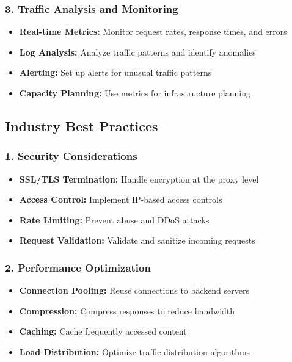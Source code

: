 \documentclass[12pt]{article}
\begin{document}
\subsubsection{3. Traffic Analysis and Monitoring}
\begin{itemize}
    \item \textbf{Real-time Metrics:} Monitor request rates, response times, and errors
    \item \textbf{Log Analysis:} Analyze traffic patterns and identify anomalies
    \item \textbf{Alerting:} Set up alerts for unusual traffic patterns
    \item \textbf{Capacity Planning:} Use metrics for infrastructure planning
\end{itemize}

\subsection{Industry Best Practices}

\subsubsection{1. Security Considerations}
\begin{itemize}
    \item \textbf{SSL/TLS Termination:} Handle encryption at the proxy level
    \item \textbf{Access Control:} Implement IP-based access controls
    \item \textbf{Rate Limiting:} Prevent abuse and DDoS attacks
    \item \textbf{Request Validation:} Validate and sanitize incoming requests
\end{itemize}

\subsubsection{2. Performance Optimization}
\begin{itemize}
    \item \textbf{Connection Pooling:} Reuse connections to backend servers
    \item \textbf{Compression:} Compress responses to reduce bandwidth
    \item \textbf{Caching:} Cache frequently accessed content
    \item \textbf{Load Distribution:} Optimize traffic distribution algorithms
\end{itemize}
\end{document}
